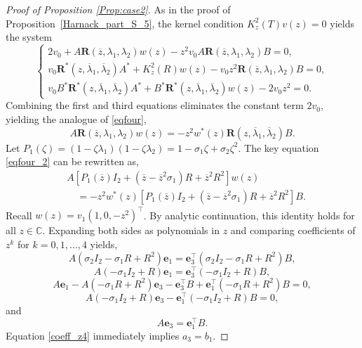 \documentclass[12pt, reqno]{amsart}
\theoremstyle{definition}
\theoremstyle{remark}
\numberwithin{equation}{section}
\begin{document}
\begin{proof}[Proof of Proposition \ref{Prop:case2}]
	As in the proof of Proposition~\ref{Harnack_part_S_5}, the kernel condition $K_z^2(T)v(z) = 0$ yields the system
	\begin{equation}\label{system01_2} 
		\begin{cases}
			2v_0 + A \mathbf{R}(\overline{z}, \lambda_1, \lambda_2) w(z) - z^2 v_0 A \mathbf{R}(\overline{z}, \lambda_1, \lambda_2) B = 0,\\
			v_0 \mathbf{R}^*(z, \overline{\lambda}_1, \overline{\lambda}_2) A^* + K_z^2(R) w(z) - v_0 z^2 \mathbf{R}(\overline{z}, \lambda_1, \lambda_2) B = 0,\\
			v_0 B^* \mathbf{R}^*(z, \overline{\lambda}_1, \overline{\lambda}_2) A^* + B^* \mathbf{R}^*(z, \overline{\lambda}_1, \overline{\lambda}_2) w(z) - 2v_0 z^2 = 0.
		\end{cases} 
	\end{equation}
	Combining the first and third equations eliminates the constant term $2v_0$, yielding the analogue of \eqref{eqfour},
	\begin{equation}\label{eqfour_2}
		A \mathbf{R}(\overline{z}, \lambda_1, \lambda_2) w(z) = -z^2 w^*(z) \mathbf{R}(z, \overline{\lambda}_1, \overline{\lambda}_2) B.
	\end{equation}
	Let $P_1(\zeta) = (1 - \zeta\lambda_1)(1 - \zeta\lambda_2) = 1 - \sigma_1\zeta + \sigma_2\zeta^2$. The key equation \eqref{eqfour_2} can be rewritten as,
	\begin{align}\label{poly_identity}
		&A \left[ P_1(\overline{z}) I_2 + (\overline{z} - \overline{z}^2\sigma_1) R + \overline{z}^2 R^2 \right] w(z) \nonumber \\
		&\quad = -z^2 w^*(z)  \left[ P_1(\overline{z}) I_2 + (\overline{z} - \overline{z}^2\sigma_1) R + \overline{z}^2 R^2 \right] B.
	\end{align}
	Recall $w(z) = v_1 (1, 0, -z^2)^\top$. By analytic continuation, this identity holds for all $z \in \mathbb{C}$. Expanding both sides as polynomials in $z$ and comparing coefficients of $z^k$ for $k = 0, 1, \dots, 4$ yields, 
		\begin{equation}\label{coeff_z0}
			A (\sigma_2 I_2 - \sigma_1 R + R^2) \mathbf{e}_1 = \mathbf{e}_3^\top (\sigma_2 I_2 - \sigma_1 R + R^2) B,
		\end{equation} 
		\begin{equation}\label{coeff_z1}
			A (-\sigma_1 I_2 + R) \mathbf{e}_1 = \mathbf{e}_3^\top (-\sigma_1 I_2 + R) B,
		\end{equation}
		\begin{equation}
			 A \mathbf{e}_1 - A(-\sigma_1 R + R^2)\mathbf{e}_3
		 - \mathbf{e}_3^\top B + \mathbf{e}_1^\top (-\sigma_1 R + R^2) B = 0, \label{coeff_z2}
		\end{equation} 
	\begin{equation}
	  A(-\sigma_1 I_2 + R)\mathbf{e}_3 -  \mathbf{e}_1^\top (-\sigma_1 I_2 + R) B = 0, \label{coeff_z3}
		\end{equation} 
and
		\begin{equation}\label{coeff_z4}
			A \mathbf{e}_3 = \mathbf{e}_1^\top B.
		\end{equation}
	Equation \eqref{coeff_z4} immediately implies $a_3 = b_1$.
	

\end{proof}
\end{document}
